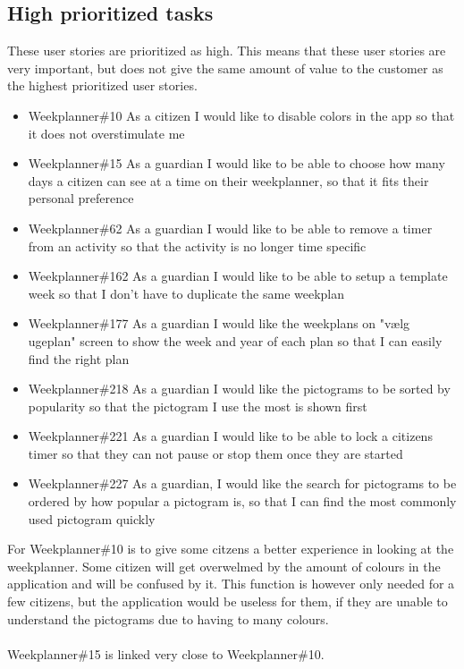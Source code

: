 \subsection{High prioritized tasks}
These user stories are prioritized as high. 
This means that these user stories are very important, but does not give the same amount of value to the customer as the highest prioritized user stories.
\begin{itemize}
    \item Weekplanner\#10 As a citizen I would like to disable colors in the app so that it does not overstimulate me
    \item Weekplanner\#15 As a guardian I would like to be able to choose how many days a citizen can see at a time on their weekplanner, so that it fits their personal preference 
    \item Weekplanner\#62 As a guardian I would like to be able to remove a timer from an activity so that the activity is no longer time specific
    \item Weekplanner\#162 As a guardian I would like to be able to setup a template week so that I don't have to duplicate the same weekplan  
    \item Weekplanner\#177 As a guardian I would like the weekplans on "vælg ugeplan" screen to show the week and year of each plan so that I can easily find the right plan 
    \item Weekplanner\#218 As a guardian I would like the pictograms to be sorted by popularity so that the pictogram I use the most is shown first
    \item Weekplanner\#221 As a guardian I would like to be able to lock a citizens timer so that they can not pause or stop them once they are started
    \item Weekplanner\#227 As a guardian, I would like the search for pictograms to be ordered by how popular a pictogram is, so that I can find the most commonly used pictogram quickly
\end{itemize}
\noindent
For Weekplanner\#10 is to give some citzens a better experience in looking at the weekplanner. 
Some citizen will get overwelmed by the amount of colours in the application and will be confused by it. 
This function is however only needed for a few citizens, but the application would be useless for them, if they are unable to understand the pictograms due to having to many colours.
\\\\
Weekplanner\#15 is linked very close to Weekplanner\#10. 
